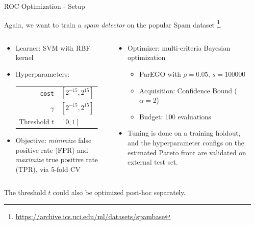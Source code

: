 \documentclass[11pt,compress,t,notes=noshow,xcolor=table]{beamer}
\begin{document}
\begin{vbframe}{ROC Optimization - Setup}

Again, we want to train a \textit{spam detector} on the popular Spam dataset%
\footnote{\url{https://archive.ics.uci.edu/ml/datasets/spambase}}.

\vspace{-0.2cm}

\begin{columns}
\begin{column}{0.5\textwidth}
\begin{itemize}
  \item Learner: SVM with RBF kernel
  \item Hyperparameters:
  \begin{tabular}{rl}
    \texttt{cost} & $[2^{-15}, 2^{15}]$ \\
    $\gamma$      & $[2^{-15}, 2^{15}]$ \\
    Threshold $t$ & $[0,1]$ 
  \end{tabular}
  \item Objective: \emph{minimize} false positive rate (FPR) and \emph{maximize} true positive rate (TPR), via 5-fold CV
\end{itemize}
\end{column}
\begin{column}{0.5\textwidth}
\begin{itemize}
  \item Optimizer: multi-criteria Bayesian optimization
  \begin{itemize}
    \item ParEGO with $\rho=0.05$, $s=100000$
    \item Acquisition: Confidence Bound ($\alpha=2$)
    \item Budget: 100 evaluations
  \end{itemize}
  \item Tuning is done on a training holdout, and the hyperparameter configs on the estimated Pareto front are validated on external test set.
\end{itemize}
\end{column}
\end{columns}
\vspace{0.1cm}
{\footnotesize The threshold $t$ could also be optimized post-hoc separately.}

\end{vbframe}
\end{document}
